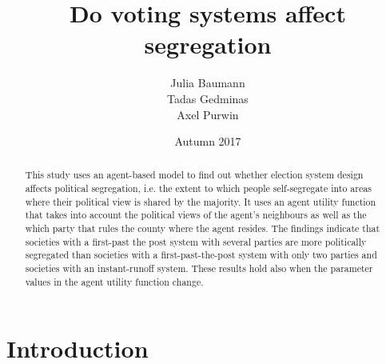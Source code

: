 \documentclass[12pt, a4paper]{article}
\title{{\Large Do voting systems affect segregation}\\
	\vspace{3mm}{\Large Term Paper, Software Engineering for Economists}%
}
\author{Julia Baumann\\ Tadas Gedminas\\Axel Purwin}
\date{Autumn 2017}
\begin{document}
	
	\maketitle \thispagestyle{empty}
	
	\begin{abstract}
		
		\setlength{\baselineskip}{10.5pt} 
		
		\vspace{0.5cm} 
		\noindent  This study uses an agent-based model to find out whether election system design affects political segregation, i.e. the extent to which people self-segregate into areas where their political view is shared by the majority. It uses an agent utility function that takes into account the political views of the agent's neighbours as well as the which party that rules the county where the agent resides. The findings indicate that societies with a first-past the post system with several parties are more politically segregated than societies with a first-past-the-post system with only two parties and societies with an instant-runoff system. These results hold also when the parameter values in the agent utility function change.   
		\vspace{0.5cm}  %
		
	\end{abstract}
	
	\newpage
	
	
	\setcounter{page}{1}%
	
	
	\section{\label{sec_intro}Introduction}
	
\end{document}
